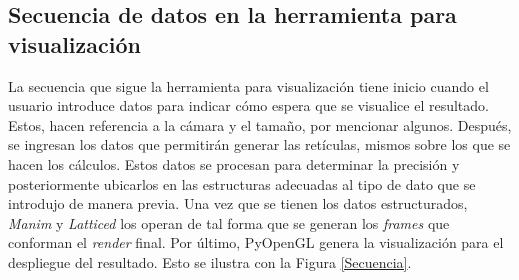 \documentclass{llncs}
\begin{document}
\subsection{Secuencia de datos en la herramienta para visualización}
La secuencia que sigue la herramienta para visualización tiene inicio cuando el usuario introduce datos para indicar cómo espera que se visualice el resultado. Estos, hacen referencia a la c\'amara y el tamaño, por mencionar algunos. Después, se ingresan los datos que permitirán generar las ret\'iculas, mismos sobre los que se hacen los c\'alculos. Estos datos se procesan para determinar la precisi\'on y posteriormente ubicarlos en las estructuras adecuadas al tipo de dato que se introdujo de manera previa. Una vez que se tienen los datos estructurados, \textit{Manim} y \textit{Latticed} los operan de tal forma que se generan los \textit{frames} que conforman el \textit{render} final. Por \'ultimo, PyOpenGL genera la visualizaci\'on para el despliegue del resultado. Esto se ilustra con la Figura \ref{Secuencia}. 




\end{document}
